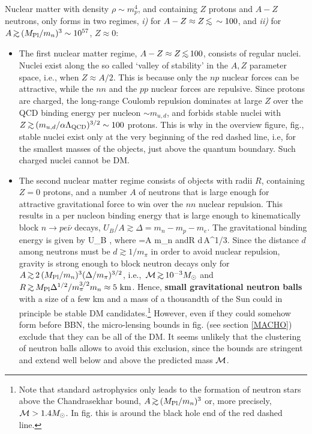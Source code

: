 Nuclear matter with density $\rho\sim m_p^4$, and 
containing $Z$ protons and $A-Z$ neutrons, only forms in two regimes, 
{\em i)} for $A-Z \approx Z\circa{<} \sim 100 $, 
and 
{\em ii)} for $A\circa{>}(M_{\rm Pl}/m_n)^3\sim 10^{57}$, $Z\approx 0$:
\begin{itemize}
\item[$\circ$] The first nuclear matter regime, $A-Z \approx Z\circa{<} 100$, consists of regular nuclei.
Nuclei exist along the so called `valley of stability' in the $A,Z$ parameter space, i.e., when $Z\approx A/2$. This is because
only the $np$ nuclear forces can be attractive, while the $nn$ and the $pp$ nuclear forces are repulsive.
Since protons are charged, the long-range 
Coulomb repulsion dominates at large $Z$ over the QCD binding energy per nucleon $\sim m_{u,d}$, 
and forbids stable nuclei with $Z\circa{>}(m_{u,d}/\alpha\Lambda_{\rm QCD})^{3/2}\sim100$ protons.
This is why in the overview figure,  fig., stable nuclei exist only at the very beginning of
the red dashed line, i.e, for the smallest masses of the objects, just above the quantum boundary.
Such charged nuclei cannot be DM.


\item[$\circ$] 
The second nuclear matter regime consists of objects with radii $R$, containing $Z=0$ protons, and a number $A$ of neutrons 
that is large enough for attractive gravitational force to win over the $nn$ nuclear repulsion. This results in a per nucleon binding energy
 that is large enough to kinematically block $n\to p e\bar\nu$ decays,
$U_B/A \gtrsim \Delta =m_n-m_p-m_e$.
The gravitational binding energy is given by
\beq \label{eq:Unuclei}
U_B \approx  {} ,\qquad
\hbox{where} =A m_n
\qquad\hbox{and}\qquad R \approx d\,A^{1/3}.
\eeq
Since the distance $d$ among neutrons must be $d\gtrsim 1/m_\pi$ in order to avoid nuclear repulsion,
gravity is strong enough to block neutron decays only for
$A\circa{>} 2 \, (M_{\rm Pl}/m_n)^3 (\Delta/m_\pi)^{3/2}$,
i.e.,\ ${\cal M}\circa{>}10^{-3} M_\odot$ and
$R\circa{>}  M_{\rm Pl} \Delta^{1/2}/m_\pi^{3/2}m_n \approx 5\,\,{\rm km}$. Hence, {\bf small gravitational neutron balls} with a size of a few km and a mass of a thousandth of the Sun could in principle be stable DM candidates.\footnote{Note that standard astrophysics only leads to the formation of neutron stars  above the Chandrasekhar bound, 
$A\circa{>}  (M_{\rm Pl}/m_n)^3 $ or, more precisely, ${\cal M}>1.4 M_\odot$. In fig. this is 
around the black hole end of the red dashed line.}
However, even if they could somehow form before BBN, the micro-lensing bounds in fig. (see section \ref{MACHO}) exclude that they can be all of the DM. It seems unlikely that the clustering of neutron balls allows to avoid this exclusion, since the bounds are stringent and extend well below and above the predicted mass ${\cal M}$.
\end{itemize}


